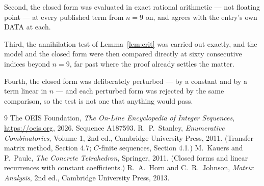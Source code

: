\documentclass[11pt,a4paper]{article}
\theoremstyle{plain}
\theoremstyle{definition}
\begin{document}
Second, the closed form was evaluated in exact rational arithmetic --- not floating point ---
at every published term from $n=9$ on, and agrees with the entry's own DATA at each.

Third, the annihilation test of Lemma~\ref{lem:crit} was carried out exactly, and the model
and the closed form were then compared directly at sixty consecutive indices beyond
$n=9$, far past where the proof already settles the matter.

Fourth, the closed form was deliberately perturbed --- by a constant and by a term linear in
$n$ --- and each perturbed form was rejected by the same comparison, so the test is not one
that anything would pass.

\begin{thebibliography}{9}
 The OEIS Foundation, \emph{The On-Line Encyclopedia of Integer
Sequences}, \url{https://oeis.org}, 2026. Sequence A187593.
 R.~P.~Stanley, \emph{Enumerative Combinatorics}, Volume 1, 2nd ed.,
Cambridge University Press, 2011. (Transfer-matrix method, Section 4.7; $C$-finite sequences,
Section 4.1.)
 M.~Kauers and P.~Paule, \emph{The Concrete Tetrahedron}, Springer, 2011.
(Closed forms and linear recurrences with constant coefficients.)
 R.~A.~Horn and C.~R.~Johnson, \emph{Matrix Analysis}, 2nd ed., Cambridge
University Press, 2013.
\end{thebibliography}
\end{document}
